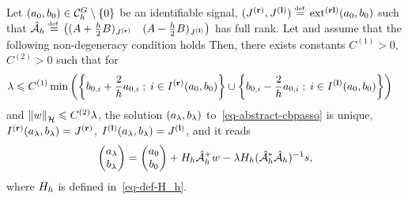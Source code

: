 \begin{thm}\label{thm-abstract-cbp}
  Let $(a_0,b_0)\in \mathcal{C}_h^G\setminus\{0\}$ be an identifiable signal, 
  	$({J^{\mathbf{(r)}}},{J^{\mathbf{(l)}}}) \stackrel{\mbox{\upshape\tiny def.}}{=} \operatorname{ext^{\mathbf{(rl)}}}(a_0,b_0)$ such that
   ${\hat{\mathcal{A}}_h}\stackrel{\mbox{\upshape\tiny def.}}{=}\begin{pmatrix}({A}+\frac{h}{2}{B})_{{J^{\mathbf{(r)}}}} &({A}-\frac{h}{2}{B})_{{J^{\mathbf{(l)}}}}\end{pmatrix}$ has full rank.
   Let  
  and assume that the following non-degeneracy condition holds
  Then, there exists constants $C^{(1)}>0$, $C^{(2)}>0$ such that for 
\begin{align}
\lambda &\leqslant C^{(1)} \min\left(\left\{ b_{0,i}+\frac{2}{h}a_{0,i} \;;\; i\in {I^{\mathbf{(r)}}}(a_0,b_0) \right\}\cup \left\{ b_{0,i}-\frac{2}{h}a_{0,i}  \;;\; i\in{I^{\mathbf{(l)}}}(a_0,b_0) \right\}\right)\end{align}
and $\left\lVert w \right\rVert_{\mathcal{H}}\leqslant C^{(2)}\lambda$, the solution $(a_\lambda,b_\lambda)$ to~\eqref{eq-abstract-cbpasso} is unique, ${I^{\mathbf{(r)}}}(a_\lambda,b_\lambda)={J^{\mathbf{(r)}}}$, ${I^{\mathbf{(l)}}}(a_\lambda,b_\lambda)={J^{\mathbf{(l)}}}$, and it reads
\begin{align*}
  \begin{pmatrix}
  a_\lambda \\ b_\lambda
\end{pmatrix} = \begin{pmatrix}
  a_0 \\ b_0
\end{pmatrix} +H_h{\hat{\mathcal{A}}_h}^+ w - \lambda H_h({\hat{\mathcal{A}}_h}^*{\hat{\mathcal{A}}_h})^{-1}s,
\end{align*}
where $H_h$ is defined in~\eqref{eq-def-H_h}.
\end{thm}



